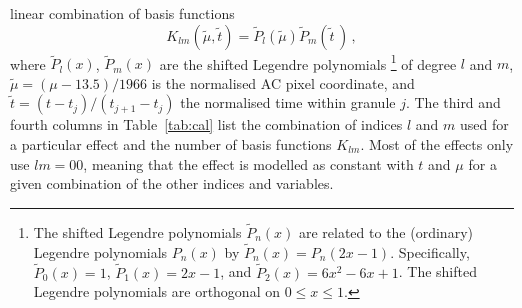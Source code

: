 \documentclass[longauth]{aa} %
\begin{document}
linear combination of basis functions
\begin{equation}\label{eq:Klm}
K_{lm}(\tilde{\mu},\tilde{t})=\tilde{P}_l(\tilde{\mu})\tilde{P}_m(\tilde{t}\,) \, ,
\end{equation}
where $\tilde{P}_l(x)$, $\tilde{P}_m(x)$ are the shifted Legendre polynomials%
\footnote{The shifted Legendre polynomials $\tilde{P}_n(x)$ are related to the 
(ordinary) Legendre polynomials $P_n(x)$ by $\tilde{P}_n(x)=P_n(2x-1)$.
Specifically, $\tilde{P}_0(x)=1$, $\tilde{P}_1(x)=2x-1$, and 
$\tilde{P}_2(x)=6x^2-6x+1$. The shifted Legendre polynomials are orthogonal 
on $0\le x\le 1$.\label{fn2}}
of degree $l$ and $m$,
$\tilde{\mu}=(\mu-13.5)/1966$ is the normalised AC pixel coordinate, and 
$\tilde{t}=(t-t_j)/(t_{j+1}-t_j)$ the normalised time within granule $j$.
The third and fourth columns in Table~\ref{tab:cal} list the combination of indices 
$l$ and $m$ used for a particular effect and the number of basis functions 
$K_{lm}$. Most of the effects only
use $lm=00$, meaning that the effect is modelled as constant with $t$ and $\mu$
for a given combination of the other indices and variables.
\end{document}
